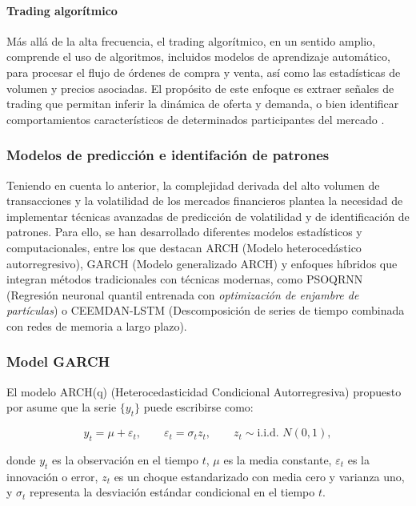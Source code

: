 \documentclass[12pt]{paper}
\begin{document}
\paragraph{Trading algorítmico}
Más allá de la alta frecuencia, el trading algorítmico, en un sentido amplio, comprende el uso de algoritmos, incluidos modelos de aprendizaje automático, para procesar el flujo de órdenes de compra y venta, así como las estadísticas de volumen y precios asociadas. El propósito de este enfoque es extraer señales de trading que permitan inferir la dinámica de oferta y demanda, o bien identificar comportamientos característicos de determinados participantes del mercado \cite{jansen2020machine}.

\subsubsection[Modelos de predicción e identifación de patrones]{Modelos de predicción e identifación de patrones}
Teniendo en cuenta lo anterior, la complejidad derivada del alto volumen de transacciones y la volatilidad de los mercados financieros plantea la necesidad de implementar técnicas avanzadas de predicción de volatilidad y de identificación de patrones. Para ello, se han desarrollado diferentes modelos estadísticos y computacionales, entre los que destacan ARCH (Modelo heterocedástico autorregresivo), GARCH (Modelo generalizado ARCH) y enfoques híbridos que integran métodos tradicionales con técnicas modernas, como PSOQRNN (Regresión neuronal quantil entrenada con \textit{optimización de enjambre de partículas}) o CEEMDAN-LSTM (Descomposición de series de tiempo combinada con redes de memoria a largo plazo).

\subsubsection[Modelos GARCH]{Model GARCH}

El modelo ARCH(q) (Heterocedasticidad Condicional Autorregresiva) propuesto por \cite{engle1982arch} asume que la serie $\{y_t\}$ puede escribirse como:

\begin{equation}
    y_t = \mu + \varepsilon_t,
    \qquad
    \varepsilon_t = \sigma_t z_t,
    \qquad
    z_t \sim \text{i.i.d. }N(0,1),
\end{equation}

donde $y_t$ es la observación en el tiempo $t$, $\mu$ es la media constante,
$\varepsilon_t$ es la innovación o error, $z_t$ es un choque estandarizado con media cero y varianza uno,
y $\sigma_t$ representa la desviación estándar condicional en el tiempo $t$.
\end{document}

